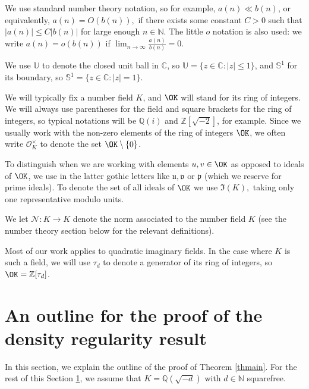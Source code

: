 \documentclass[11pt]{amsart}
\theoremstyle{definition}
\newcommand{\C}{{\mathbb C}}
\newcommand{\N}{{\mathbb N}}
\newcommand{\NN}{{\mathcal N}}
\newcommand{\Q}{{\mathbb Q}}
\renewcommand{\S}{\mathbb{S}}
\newcommand{\Z}{{\mathbb Z}}
\newcommand{\U}{{\mathbb U}}
\newcommand{\mf}{\mathfrak}
\begin{document}
We use standard number theory notation, so for example, $a(n) \ll b(n)$, or equivalently, $a(n)=O(b(n)),$ if there exists some constant $C>0$ such that $|a(n)| \leq C|b(n)|$ for large enough $n \in \N$. The little $o$ notation is also used: we write $a(n)=o(b(n))$ if $\lim_{n \to \infty} \frac{a(n)}{b(n)}=0$.


We use $\U$ to denote the closed unit ball in $\C$, so $\U=\{ z \in \C : |z| \leq 1\}$, and $\S^1$ for its boundary, so $\S^1=\{ z \in \C : |z|=1\}$.

We will typically fix a number field $K$, and $\OK$ will stand for its ring of integers. We will always use parentheses for the field and square brackets for the ring of integers, so typical notations will be $\Q(i)$ and $\Z[\sqrt{-2}]$, for example. Since we usually work with the non-zero elements of the ring of integers $\OK$, we often write $\mathcal{O}_K^{\times}$  to denote the set $\OK \setminus \{0\}$. 

To distinguish when we are working with elements $u,v \in \OK$ as opposed to ideals of $\OK$, we use in the latter gothic letters like $\mf u, \mf v$ or $\mf p$ (which we reserve for prime ideals). To denote the set of all ideals of $\OK$ we use $\mf I(K),$ taking only one representative modulo units.

We let $\NN: K \to K$ denote the norm associated to the number field $K$ (see the number theory section below for the relevant definitions). 

Most of our work applies to quadratic imaginary fields. In the case where $K$ is such a field, we will use $\tau_d$ to denote a generator of its ring of integers, so $\OK=\Z[\tau_d]$.


 




\section{An outline for the proof of the density regularity result}\label{sec: proofstrat}



In this section, we explain the outline of the proof of Theorem \ref{thmain}. For the rest of this Section \ref{sec: proofstrat}, we assume that $K=\Q(\sqrt{-d})$ with $d\in\N$ squarefree.
\end{document}
